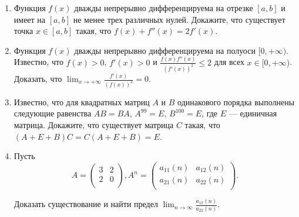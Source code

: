 \begin{enumerate}
\item Функция $f(x)$ дважды непрерывно дифференцируема на отрезке $[a, b]$ и имеет на $[a, b]$ не менее трех различных нулей. Докажите, что существует точка $x \in [a, b]$ такая, что $f(x) + f''(x) = 2 f'(x)$. 

\item Функция $f(x)$ дважды непрерывно дифференцируема на полуоси $[0, +\infty)$. Известно, что $f(x) > 0$, $f'(x) > 0$ и $\frac{f(x) f''(x)}{(f'(x))^2} \leqslant 2$ для всех $x \in [0, +\infty)$. Доказать, что $\lim_{x \to +\infty} \frac{f'(x)}{(f(x))^2} = 0$.

\item Известно, что для квадратных матриц $A$ и $B$ одинакового порядка выполнены следующие равенства $AB = BA$, $A^{99} = E$, $B^{100} = E$, где $E$ --- единичная матрица. Докажите, что существует матрица $C$ такая, что $(A + E + B) C = C (A + E + B) = E$.

\item Пусть
$$A = 
\begin{pmatrix}
3 & 2 \\
2 & 0 \\
\end{pmatrix},
A^n =
\begin{pmatrix}
a_{11}(n) & a_{12}(n) \\
a_{21}(n) & a_{22}(n) \\
\end{pmatrix}.
$$

Доказать существование и найти предел $\lim_{n \to \infty} \frac{a_{12}(n)}{a_{22}(n)}$.

\end{enumerate}